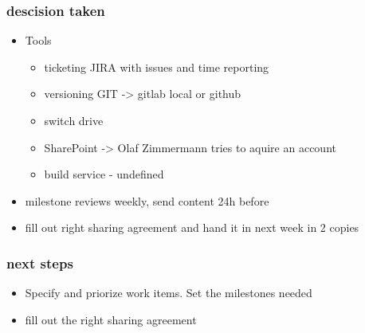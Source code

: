 \documentclass{article}
\begin{document}
\subsubsection{descision taken}

\begin{itemize}
    \item Tools
        \begin{itemize}
            \item ticketing JIRA with issues and time reporting 
            \item versioning GIT -> gitlab local or github
            \item switch drive
            \item SharePoint -> Olaf Zimmermann tries to aquire an account
            \item build service - undefined
        \end{itemize}
    \item milestone reviews weekly, send content 24h before
    \item fill out right sharing agreement and hand it in next week in 2 copies
\end{itemize}

\subsubsection{next steps}
\begin{itemize}
    \item Specify and priorize work items. Set the milestones needed
    \item fill out the right sharing agreement
\end{itemize}
\end{document}
